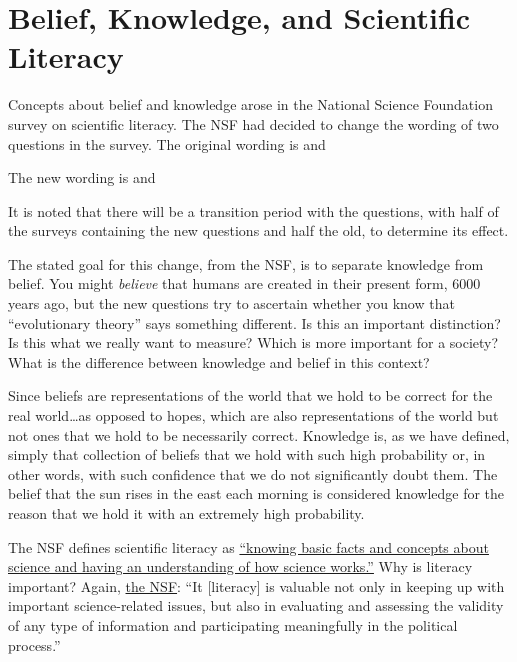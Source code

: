 \section{Belief, Knowledge, and Scientific Literacy}

Concepts about belief and knowledge arose in the National Science Foundation survey on scientific literacy.  The NSF had decided to change the wording of two questions in the
survey. The original wording is 
 and 

 The new wording is  and 

 It is noted that there will be a transition period with the questions, with half of the surveys containing the new questions and half the old, to determine its effect.

The stated goal for this change, from the NSF, is to separate knowledge
from belief. You might \emph{believe} that humans are created in their
present form, 6000 years ago, but the new questions try to ascertain
whether you know that ``evolutionary theory'' says something different.
Is this an important distinction? Is this what we really want to
measure? Which is more important for a society? What is the difference
between knowledge and belief in this context?

Since beliefs are representations of the world that we hold to be correct for the real world\ldots{}as
opposed to hopes, which are also representations of the world but not
ones that we hold to be necessarily correct. Knowledge is, as we have defined, simply that collection
of beliefs that we hold with such high probability or, in other words,
with such confidence that we do not significantly doubt them. The belief
that the sun rises in the east each morning is considered knowledge for
the reason that we hold it with an extremely high probability. 

The NSF defines scientific literacy as
\href{http://www.nsf.gov/statistics/seind04/c7/c7s2.htm}{``knowing basic
facts and concepts about science and having an understanding of how
science works.''} Why is literacy important? Again,
\href{http://www.nsf.gov/statistics/seind04/c7/c7s2.htm}{the NSF}: ``It [literacy] is valuable not only in keeping up with important science-related issues, but also in evaluating and assessing the validity of any type of information and participating meaningfully in the political process.''

